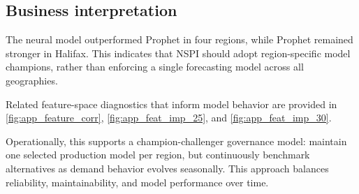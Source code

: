 \subsection{Business interpretation}
The neural model outperformed Prophet in four regions, while Prophet remained stronger in Halifax. This indicates that NSPI should adopt region-specific model champions, rather than enforcing a single forecasting model across all geographies.

Related feature-space diagnostics that inform model behavior are provided in \autoref{fig:app_feature_corr}, \autoref{fig:app_feat_imp_25}, and \autoref{fig:app_feat_imp_30}.

Operationally, this supports a champion-challenger governance model: maintain one selected production model per region, but continuously benchmark alternatives as demand behavior evolves seasonally. This approach balances reliability, maintainability, and model performance over time.